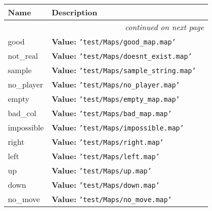     \vspace{-1cm}
\hspace{\varindent}\begin{longtable}{|p{\varnamewidth}|p{\vardescrwidth}|l}
\cline{1-2}
\cline{1-2} \centering \textbf{Name} & \centering \textbf{Description}& \\
\cline{1-2}
\endhead\cline{1-2}\multicolumn{3}{r}{\small\textit{continued on next page}}\\\endfoot\cline{1-2}
\endlastfoot\raggedright g\-o\-o\-d\- & \raggedright \textbf{Value:} 
{\tt \texttt{'}\texttt{test/Maps/good\_map.map}\texttt{'}}&\\
\cline{1-2}
\raggedright n\-o\-t\-\_\-r\-e\-a\-l\- & \raggedright \textbf{Value:} 
{\tt \texttt{'}\texttt{test/Maps/doesnt\_exist.map}\texttt{'}}&\\
\cline{1-2}
\raggedright s\-a\-m\-p\-l\-e\- & \raggedright \textbf{Value:} 
{\tt \texttt{'}\texttt{test/Maps/sample\_string.map}\texttt{'}}&\\
\cline{1-2}
\raggedright n\-o\-\_\-p\-l\-a\-y\-e\-r\- & \raggedright \textbf{Value:} 
{\tt \texttt{'}\texttt{test/Maps/no\_player.map}\texttt{'}}&\\
\cline{1-2}
\raggedright e\-m\-p\-t\-y\- & \raggedright \textbf{Value:} 
{\tt \texttt{'}\texttt{test/Maps/empty\_map.map}\texttt{'}}&\\
\cline{1-2}
\raggedright b\-a\-d\-\_\-c\-o\-l\- & \raggedright \textbf{Value:} 
{\tt \texttt{'}\texttt{test/Maps/bad\_map.map}\texttt{'}}&\\
\cline{1-2}
\raggedright i\-m\-p\-o\-s\-s\-i\-b\-l\-e\- & \raggedright \textbf{Value:} 
{\tt \texttt{'}\texttt{test/Maps/impossible.map}\texttt{'}}&\\
\cline{1-2}
\raggedright r\-i\-g\-h\-t\- & \raggedright \textbf{Value:} 
{\tt \texttt{'}\texttt{test/Maps/right.map}\texttt{'}}&\\
\cline{1-2}
\raggedright l\-e\-f\-t\- & \raggedright \textbf{Value:} 
{\tt \texttt{'}\texttt{test/Maps/left.map}\texttt{'}}&\\
\cline{1-2}
\raggedright u\-p\- & \raggedright \textbf{Value:} 
{\tt \texttt{'}\texttt{test/Maps/up.map}\texttt{'}}&\\
\cline{1-2}
\raggedright d\-o\-w\-n\- & \raggedright \textbf{Value:} 
{\tt \texttt{'}\texttt{test/Maps/down.map}\texttt{'}}&\\
\cline{1-2}
\raggedright n\-o\-\_\-m\-o\-v\-e\- & \raggedright \textbf{Value:} 
{\tt \texttt{'}\texttt{test/Maps/no\_move.map}\texttt{'}}&\\

\end{longtable}
